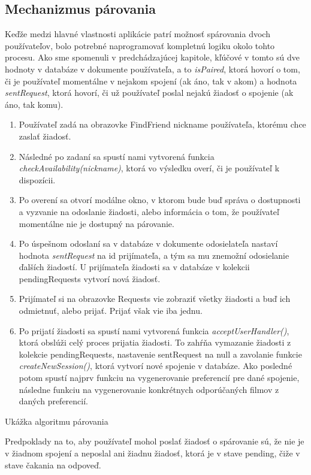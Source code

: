 \subsection{Mechanizmus párovania}
Keďže medzi hlavné vlastnosti aplikácie patrí možnosť spárovania dvoch používateľov, bolo potrebné naprogramovať kompletnú logiku okolo tohto procesu. Ako sme spomenuli v predchádzajúcej kapitole, kľúčové v tomto sú dve hodnoty v databáze v dokumente používateľa, a to \textit{isPaired}, ktorá hovorí o tom, či je používateľ momentálne v nejakom spojení (ak áno, tak v akom) a hodnota \textit{sentRequest}, ktorá hovorí, či už používateľ poslal nejakú žiadosť o spojenie (ak áno, tak komu). 
\begin{algorithm}[H]
\scriptsize
\begin{enumerate}
    \item {Používateľ zadá na obrazovke FindFriend nickname používateľa, ktorému chce zaslať žiadosť.}
    \item {Následné po zadaní sa spustí nami vytvorená funkcia \textit{checkAvailability(nickname)}, ktorá vo výsledku overí, či je používateľ k dispozícii.}
    \item {Po overení sa otvorí modálne okno, v ktorom bude buď správa o dostupnosti a vyzvanie na odoslanie žiadosti, alebo informácia o tom, že používateľ momentálne nie je dostupný na párovanie.}
    \item {Po úspešnom odoslaní sa v databáze v dokumente odosielateľa nastaví hodnota \textit{sentRequest} na id prijímateľa, a tým sa mu znemožní odosielanie ďalších žiadostí. U prijímateľa žiadosti sa v databáze v kolekcii pendingRequests vytvorí nová žiadosť.}
    \item {Prijímateľ si na obrazovke Requests vie zobraziť všetky žiadosti a buď ich odmietnuť, alebo prijať. Prijať však vie iba jednu.}
    \item {Po prijatí žiadosti sa spustí nami vytvorená funkcia \textit{acceptUserHandler()}, ktorá obslúži celý proces prijatia žiadosti. To zahŕňa vymazanie žiadosti z kolekcie pendingRequests, nastavenie sentRequest na null a zavolanie funkcie \textit{createNewSession()}, ktorá vytvorí nové spojenie v databáze. Ako posledné potom spustí najprv funkciu na vygenerovanie preferencií pre dané spojenie, následne funkciu na vygenerovanie konkrétnych odporúčaných filmov z daných preferencií.}
\end{enumerate}
\caption{Ukážka algoritmu párovania}  
\label{alg:preview}  
\end{algorithm}
Predpoklady na to, aby používateľ mohol poslať žiadosť o spárovanie sú, že nie je v žiadnom spojení a neposlal ani žiadnu žiadosť, ktorá je v stave pending, čiže v stave čakania na odpoveď. 

